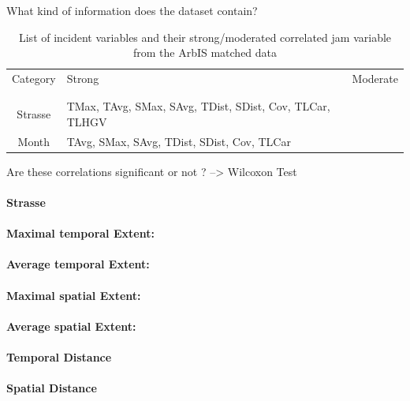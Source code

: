 \begin{table}[ht]
What kind of information does the dataset contain?

\noindent
\begin{table}[h!]
	\centering
	\begin{tabular}{c|l|l}  
		Category & Strong & Moderate \\
		\\[-1em]
		\hline
		\\[-1em]
		Strasse & TMax, TAvg, SMax, SAvg, TDist, SDist, Cov, TLCar, TLHGV & \\ 
 		Month & TAvg, SMax, SAvg, TDist, SDist, Cov, TLCar & \\
	\end{tabular}
	\caption{List of incident variables and their strong/moderated correlated jam variable from the ArbIS matched data}
\end{table}

Are these correlations significant or not ? --> Wilcoxon Test

\paragraph{Strasse}

\paragraph{Maximal temporal Extent:}
\paragraph{Average temporal Extent:}
\paragraph{Maximal spatial Extent:}
\paragraph{Average spatial Extent:}
\paragraph{Temporal Distance}
\paragraph{Spatial Distance}

\end{table}
